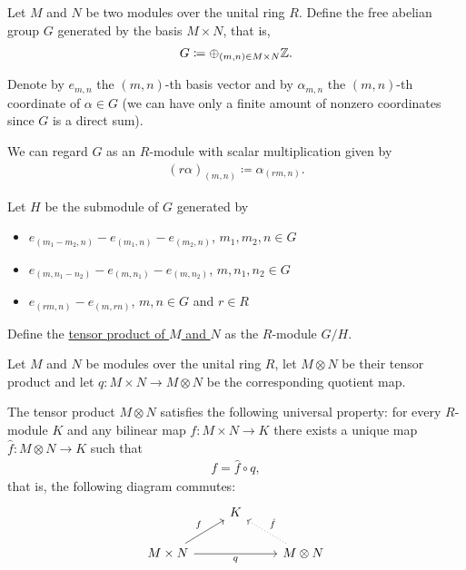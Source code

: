 \begin{definition}\label{def:module_tensor_product}\cite[574]{Knapp2016BAlg}
  Let $M$ and $N$ be two modules over the unital ring $R$. Define the free abelian group $G$ generated by the basis $M \times N$, that is,
  \begin{align*}
    G \coloneqq \oplus_{(m,n) \in M \times N} \mathbb Z.
  \end{align*}

  Denote by $e_{m,n}$ the $(m,n)$-th basis vector and by $\alpha_{m,n}$ the $(m,n)$-th coordinate of $\alpha \in G$ (we can have only a finite amount of nonzero coordinates since $G$ is a direct sum).

  We can regard $G$ as an $R$-module with scalar multiplication given by
  \begin{align*}
    (r \alpha)_{(m,n)} \coloneqq \alpha_{(rm,n)}.
  \end{align*}

  Let $H$ be the submodule of $G$ generated by
  \begin{itemize}
    \item $e_{(m_1 - m_2, n)} - e_{(m_1,n)} - e_{(m_2,n)}$, $m_1, m_2, n \in G$
    \item $e_{(m, n_1 - n_2)} - e_{(m,n_1)} - e_{(m,n_2)}$, $m, n_1, n_2 \in G$
    \item $e_{(rm,n)} - e_{(m,rn)}$, $m, n \in G$ and $r \in R$
  \end{itemize}

  Define the \ul{tensor product of $M$ and $N$} as the $R$-module $G / H$.
\end{definition}

\begin{theorem}\label{thm:tensor_product_universal_property}\cite[theorem 10.18]{Knapp2016BAlg}
  Let $M$ and $N$ be modules over the unital ring $R$, let $M \otimes N$ be their tensor product and let $q: M \times N \to M \otimes N$ be the corresponding quotient map.

  The tensor product $M \otimes N$ satisfies the following universal property: for every $R$-module $K$ and any bilinear map $f: M \times N \to K$ there exists a unique map $\hat f: M \otimes N \to K$ such that
  \begin{align*}
    f = \hat f \circ q,
  \end{align*}
  that is, the following diagram commutes:
  \begin{equation}\label{thm:tensor_product_universal_property/diagram}
    \begin{tikzcd}[baseline=(current bounding box.center)]
                                                  & K & \\
      M \times N \arrow[ru, "f"] \arrow[rr, "q"'] &   & M \otimes N \arrow[lu, "\hat f"', dotted]
    \end{tikzcd}
  \end{equation}
\end{theorem}
